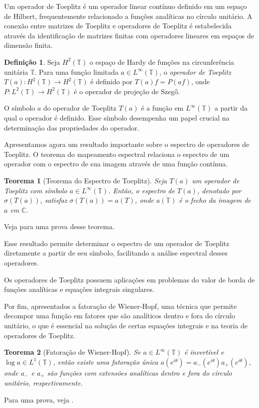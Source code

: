 \documentclass[a4paper,12pt]{article}
\newtheorem*{theorem*}{Teorema}
\theoremstyle{definition}
\newtheorem*{definition*}{Definição}
\begin{document}
Um operador de Toeplitz é um operador linear contínuo definido em um espaço de Hilbert, frequentemente relacionado a funções analíticas no círculo unitário. A conexão entre matrizes de Toeplitz e operadores de Toeplitz é estabelecida através da identificação de matrizes finitas com operadores lineares em espaços de dimensão finita.
\begin{definition*}
  Seja $H^2(\mathbb{T})$ o espaço de Hardy de funções na circunferência unitária $\mathbb{T}$. Para uma função limitada $a \in L^\infty(\mathbb{T})$, o \textit{operador de Toeplitz} $T(a) : H^2(\mathbb{T}) \to H^2(\mathbb{T})$ é definido por $T(a)f=P(af)$, onde $P : L^2(\mathbb{T}) \to H^2(\mathbb{T})$ é o operador de projeção de Szegő.
\end{definition*}
O símbolo $a$ do operador de Toeplitz $T(a)$ é a função em $L^\infty(\mathbb{T})$ a partir da qual o operador é definido. Esse símbolo desempenha um papel crucial na determinação das propriedades do operador.

Apresentamos agora um resultado importante sobre o espectro de operadores de Toeplitz. O teorema do mapeamento espectral relaciona o espectro de um operador com o espectro de sua imagem através de uma função contínua.
\begin{theorem*}[Teorema do Espectro de Toeplitz]
  Seja $T(a)$ um operador de Toeplitz com símbolo $a \in L^\infty(\mathbb{T})$. Então, o espectro de $T(a)$, denotado por $\sigma(T(a))$, satisfaz $\sigma(T(a))=a(T)$, onde $\overline{a(\mathbb{T})}$ é o fecho da imagem de $a$ em $\mathbb{C}$.
\end{theorem*}

Veja \cite[p. 85]{Douglas1998} para uma prova desse teorema.

Esse resultado permite determinar o espectro de um operador de Toeplitz diretamente a partir de seu símbolo, facilitando a análise espectral desses operadores.

Os operadores de Toeplitz possuem aplicações em problemas do valor de borda de funções analíticas e equações integrais singulares.

Por fim, apresentados a fatoração de Wiener-Hopf, uma técnica que permite decompor uma função em fatores que são analíticos dentro e fora do círculo unitário, o que é essencial na solução de certas equações integrais e na teoria de operadores de Toeplitz.
\begin{theorem*}[Fatoração de Wiener-Hopf]
  Se $a \in L^\infty(\mathbb{T})$ é invertível e $\log a \in L^1(\mathbb{T})$, então existe uma fatoração única $a(e^{i\theta}) = a_-(e^{i\theta}) a_+(e^{i\theta})$, onde $a_-$ e $a_+$ são funções com extensões analíticas dentro e fora do círculo unitário, respectivamente.
\end{theorem*}
Para uma prova, veja \cite{wiener1931}.
\end{document}
